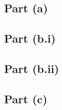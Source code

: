 \subsection{Part (a)}\label{sec:q-1-a}

\subsection{Part (b.i)}\label{sec:q-1-b-i}

\subsection{Part (b.ii)}\label{sec:q-1-b-ii}

\subsection{Part (c)}\label{sec:q-1-c}
